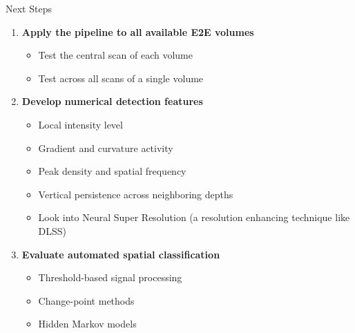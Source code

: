 \documentclass[aspectratio=169]{beamer}
\begin{document}
\begin{frame}{Next Steps}

\begin{enumerate}
    \item \textbf{Apply the pipeline to all available E2E volumes}
    \begin{itemize}
        \item Test the central scan of each volume
        \item Test across all scans of a single volume
    \end{itemize}

    \item \textbf{Develop numerical detection features}
    \begin{itemize}
        \item Local intensity level
        \item Gradient and curvature activity
        \item Peak density and spatial frequency
        \item Vertical persistence across neighboring depths
        \item Look into Neural Super Resolution (a resolution enhancing technique like DLSS)
    \end{itemize}

    \item \textbf{Evaluate automated spatial classification}
    \begin{itemize}
        \item Threshold-based signal processing
        \item Change-point methods
        \item Hidden Markov models
    \end{itemize}

\end{enumerate}

\end{frame}
\end{document}
